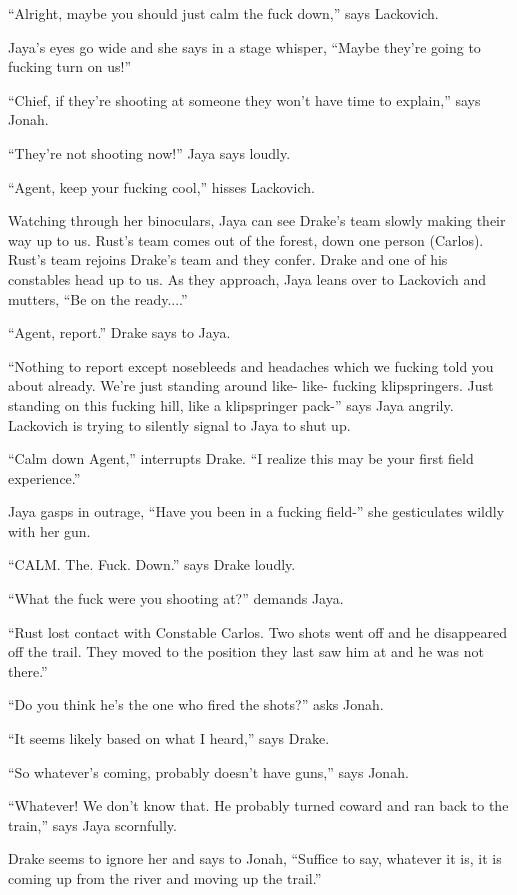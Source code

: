 ``Alright, maybe you should just calm the fuck down,'' says Lackovich.

Jaya's eyes go wide and she says in a stage whisper, ``Maybe they're going to fucking turn on us!''

``Chief, if they're shooting at someone they won't have time to explain,'' says Jonah.

``They're not shooting now!'' Jaya says loudly.

``Agent, keep your fucking cool,'' hisses Lackovich.

 

Watching through her binoculars, Jaya can see Drake's team slowly making their way up to us.  Rust's team comes out of the forest, down one person (Carlos).  Rust's team rejoins Drake's team and they confer.  Drake and one of his constables head up to us.  As they approach, Jaya leans over to Lackovich and mutters, ``Be on the ready....''

``Agent, report.'' Drake says to Jaya.

``Nothing to report except nosebleeds and headaches which we fucking told you about already.  We're just standing around like- like- fucking klipspringers.  Just standing on this fucking hill, like a klipspringer pack-'' says Jaya angrily.  Lackovich is trying to silently signal to Jaya to shut up.

``Calm down Agent,'' interrupts Drake.  ``I realize this may be your first field experience.''

Jaya gasps in outrage,  ``Have you been in a fucking field-'' she gesticulates wildly with her gun.

``CALM.  The. Fuck. Down.'' says Drake loudly.

``What the fuck were you shooting at?'' demands Jaya.

``Rust lost contact with Constable Carlos.  Two shots went off and he disappeared off the trail. They moved to the position they last saw him at and he was not there.''

``Do you think he's the one who fired the shots?'' asks Jonah.

``It seems likely based on what I heard,'' says Drake.

``So whatever's coming, probably doesn't have guns,'' says Jonah.

``Whatever!  We don't know that.  He probably turned coward and ran back to the train,'' says Jaya scornfully.

Drake seems to ignore her and says to Jonah, ``Suffice to say, whatever it is, it is coming up from the river and moving up the trail.''

